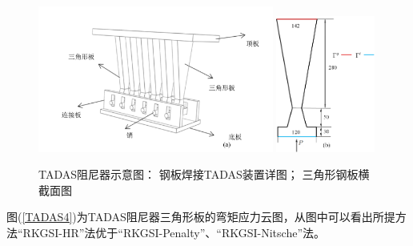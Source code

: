 \begin{figure}[H]
    \centering
    \begin{subcaptiongroup}
            \includegraphics[width=0.69\textwidth]{figure/DAMPER/TADAS/2.png}
            \label{TADAS2}
            \includegraphics[width=0.29\textwidth]{figure/DAMPER/TADAS/3.png}
            \label{TADAS3}
            \end{subcaptiongroup}
        \caption{TADAS阻尼器示意图\cite{mohammadi2017}： 钢板焊接TADAS装置详图； 三角形钢板横截面图}
    \label{TADAS2}
\end{figure}
图(\ref{TADAS4})为TADAS阻尼器三角形板的弯矩应力云图，从图中可以看出所提方法“RKGSI-HR”法优于“RKGSI-Penalty”、“RKGSI-Nitsche”法。
\newpage
